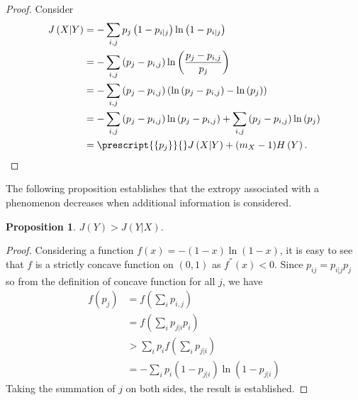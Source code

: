 \documentclass[pdflatex]{sn-jnl}%
\theoremstyle{thmstyleone}
\newtheorem{proposition}{Proposition}
\theoremstyle{thmstyletwo}%
\theoremstyle{thmstylethree}%
\begin{document}
\begin{proof}
    Consider
    \begin{equation}
    \begin{split}
        J\left( X|Y \right)&=-\sum_{i,j}p_j\left(1-p_{i|j} \right)\ln\left(1-p_{i|j} \right) \\
        &= -\sum_{i,j}\left(p_j-p_{i,j} \right)\ln\left(\frac{p_j-p_{i,j}}{p_j} \right) \\
        &= -\sum_{i,j}\left(p_j-p_{i,j} \right)\left(\ln\left({p_j-p_{i,j}}\right) -\ln \left(p_j\right) \right)\\
        &=-\sum_{i,j}\left(p_j-p_{i,j} \right)\ln\left({p_j-p_{i,j}}\right) + \sum_{i,j}\left(p_j-p_{i,j} \right)\ln\left(p_j\right) \\
        &=\prescript{\{p_j\}}{}J\left(X|Y \right) + (m_{X}-1)H\left(Y\right).
    \end{split}
    \end{equation}
\end{proof}
The following proposition establishes that the extropy associated with a phenomenon decreases when additional information is considered.
\begin{proposition}
   $J\left( Y\right)> J\left( Y|X\right)$.
\end{proposition}
\begin{proof}
    Considering a function $f(x)=-(1-x)\ln(1-x)$, it is easy to see that $f$ is a strictly concave function on $(0,1)$ as $f^{''}(x)<0$. Since $p_{ij}=p_{i|j}p_j$ so from the definition of concave function for all $j$, we have 
    \begin{equation}
    \begin{split}
        f\left(p_j\right)&=f\left(\sum_{i}p_{i,j}\right)   \\
              &=f\left(\sum_{i}p_{j|i}p_i\right)  \\
              &> \sum_{i}p_i f\left(\sum_{i}p_{j|i}\right) \\
              &=-\sum_{i}p_i \left(1-p_{j|i}\right) \ln\left(1-p_{j|i}\right)
    \end{split}
    \end{equation}
    Taking the summation of $j$ on both sides, the result is established.
\end{proof}




\end{document}
